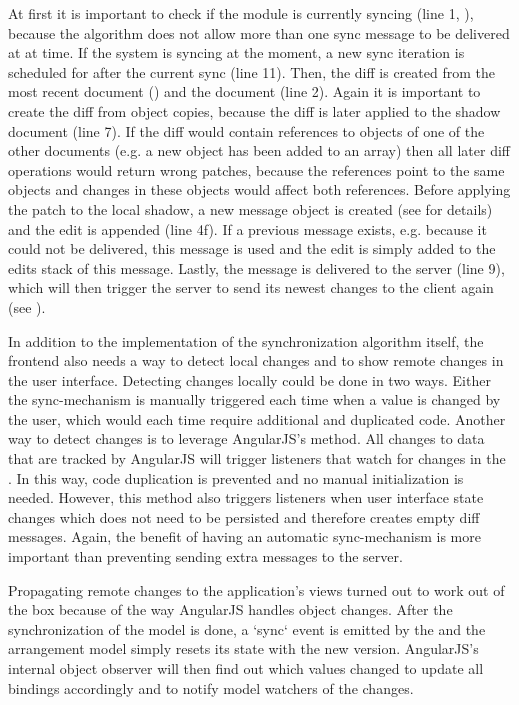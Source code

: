At first it is important to check if the module is currently syncing (line 1, ), because the algorithm does not allow more than one sync message to be delivered at at time. If the system is syncing at the moment, a new sync iteration is scheduled for after the current sync (line 11). Then, the diff is created from the most recent document () and the  document (line 2). Again it is important to create the diff from object copies, because the diff is later applied to the shadow document (line 7). If the diff would contain references to objects of one of the other documents (e.g. a new object has been added to an array) then all later diff operations would return wrong patches, because the references point to the same objects and changes in these objects would affect both references. Before applying the patch to the local shadow, a new message object is created (see  for details) and the edit is appended (line 4f). If a previous message exists, e.g. because it could not be delivered, this message is used and the edit is simply added to the edits stack of this message. Lastly, the message is delivered to the server (line 9), which will then trigger the server to send its newest changes to the client again (see ).

In addition to the implementation of the synchronization algorithm itself, the frontend also needs a way to detect local changes and to show remote changes in the user interface. Detecting changes locally could be done in two ways. Either the sync-mechanism is manually triggered each time when a value is changed by the user, which would each time require additional and duplicated code. Another way to detect changes is to leverage AngularJS's  method. All changes to data that are tracked by AngularJS will trigger listeners that watch for changes in the . In this way, code duplication is prevented and no manual initialization is needed. However, this method also triggers listeners when user interface state changes which does not need to be persisted and therefore creates empty diff messages. Again, the benefit of having an automatic sync-mechanism is more important than preventing sending extra messages to the server.

Propagating remote changes to the application's views turned out to work out of the box because of the way AngularJS handles object changes. After the synchronization of the model is done, a `sync` event is emitted by the  and the arrangement model simply resets its state with the new version. AngularJS's internal object observer will then find out which values changed to update all bindings accordingly and to notify model watchers of the changes.

